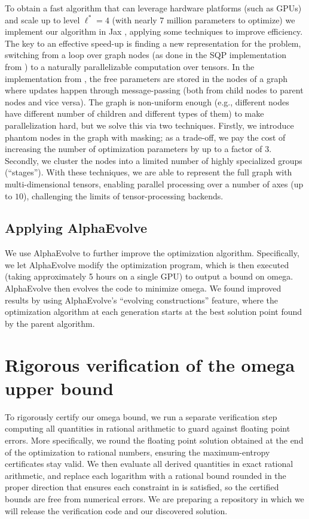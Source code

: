 \documentclass[11pt, a4paper, copyright, gdm]{google}
\newcommand{\method}{{AlphaEvolve}\xspace}
\theoremstyle{definition}
\theoremstyle{remark}
\theoremstyle{plain}
\begin{document}
To obtain a fast algorithm that can leverage hardware platforms (such as GPUs) and scale up to level $\ell^*=4$ (with nearly 7 million parameters to optimize) we implement our algorithm in Jax \citep{jax2018github}, applying some techniques to improve efficiency.
The key to an effective speed-up is finding a new representation for the problem, switching from a loop over graph nodes (as done in the SQP implementation from \cite{alman2025more}) to a naturally parallelizable computation over tensors. In the implementation from \cite{alman2025more}, the free parameters are stored in the nodes of a graph where updates happen through message-passing (both from child nodes to parent nodes and vice versa). The graph is non-uniform enough (e.g., different nodes have different number of children and different types of them) to make parallelization hard, but we solve this via two techniques. Firstly, we introduce phantom nodes in the graph with masking; as a trade-off, we pay the cost of increasing the number of optimization parameters by up to a factor of $3$. Secondly, we cluster the nodes into a limited number of highly specialized groups (``stages''). With these techniques, we are able to represent the full graph with multi-dimensional tensors, enabling parallel processing over a number of axes (up to $10$), challenging the limits of tensor-processing backends.

\subsection{Applying \method}

We use \method \citep{novikov2025alphaevolve} to further improve the optimization algorithm. Specifically, we let \method modify the optimization program, which is then executed (taking approximately 5 hours on a single GPU) to output a bound on omega. \method then evolves the code to minimize omega. We found improved results by using \method's ``evolving constructions'' feature, where the optimization algorithm at each generation starts at the best solution point found by the parent algorithm.

\section{Rigorous verification of the omega upper bound}

To rigorously certify our omega bound, we run a separate verification step computing all quantities in rational arithmetic to guard against floating point errors. More specifically, we round the floating point solution obtained at the end of the optimization to rational numbers, ensuring the maximum-entropy certificates stay valid. We then evaluate all derived quantities in exact rational arithmetic, and replace each logarithm with a rational bound rounded in the proper direction that ensures each constraint in  is satisfied, so the certified bounds are free from numerical errors. We are preparing a repository in which we will release the verification code and our discovered solution.
\end{document}
